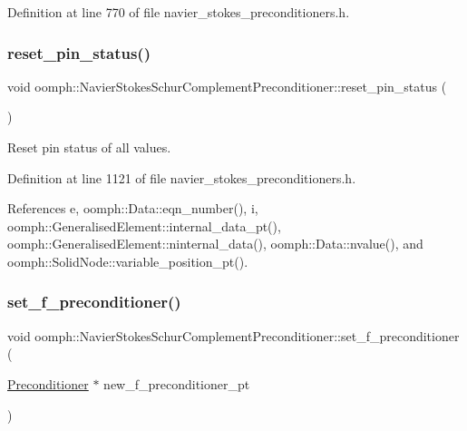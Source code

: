 Definition at line 770 of file navier\+\_\+stokes\+\_\+preconditioners.\+h.

\mbox{\label{classoomph_1_1NavierStokesSchurComplementPreconditioner_af1c121b668b1961a68010f984166947c}} 
\subsubsection{\texorpdfstring{reset\+\_\+pin\+\_\+status()}{reset\_pin\_status()}}
{\footnotesize\ttfamily void oomph\+::\+Navier\+Stokes\+Schur\+Complement\+Preconditioner\+::reset\+\_\+pin\+\_\+status (\begin{DoxyParamCaption}{ }\end{DoxyParamCaption})\hspace{0.3cm}{\ttfamily [inline]}}



Reset pin status of all values. 



Definition at line 1121 of file navier\+\_\+stokes\+\_\+preconditioners.\+h.



References e, oomph\+::\+Data\+::eqn\+\_\+number(), i, oomph\+::\+Generalised\+Element\+::internal\+\_\+data\+\_\+pt(), oomph\+::\+Generalised\+Element\+::ninternal\+\_\+data(), oomph\+::\+Data\+::nvalue(), and oomph\+::\+Solid\+Node\+::variable\+\_\+position\+\_\+pt().

\mbox{\label{classoomph_1_1NavierStokesSchurComplementPreconditioner_ab2f387b87192dd2f7b6725cfe3aae44e}} 
\subsubsection{\texorpdfstring{set\+\_\+f\+\_\+preconditioner()}{set\_f\_preconditioner()}}
{\footnotesize\ttfamily void oomph\+::\+Navier\+Stokes\+Schur\+Complement\+Preconditioner\+::set\+\_\+f\+\_\+preconditioner (\begin{DoxyParamCaption}\item[{\hyperlink{classoomph_1_1Preconditioner}{Preconditioner} $\ast$}]{new\+\_\+f\+\_\+preconditioner\+\_\+pt }\end{DoxyParamCaption})\hspace{0.3cm}{\ttfamily [inline]}}



